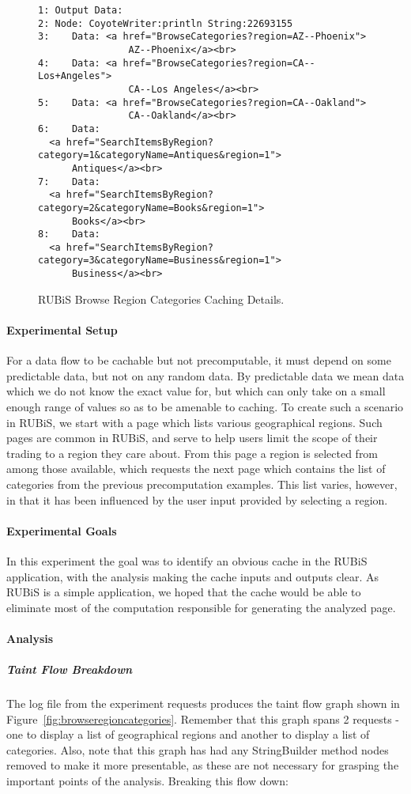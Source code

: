 \documentclass[msc,oneside]{ubcthesis}
\begin{document}
\begin{figure}[ht]
  \caption{\label{fig:browseregioncategoriescd} RUBiS Browse Region Categories Caching Details.}
\begin{verbatim}
1: Output Data:
2: Node: CoyoteWriter:println String:22693155
3:    Data: <a href="BrowseCategories?region=AZ--Phoenix">
                AZ--Phoenix</a><br>
4:    Data: <a href="BrowseCategories?region=CA--Los+Angeles">
                CA--Los Angeles</a><br>
5:    Data: <a href="BrowseCategories?region=CA--Oakland">
                CA--Oakland</a><br>
6:    Data: 
  <a href="SearchItemsByRegion?category=1&categoryName=Antiques&region=1">
      Antiques</a><br>
7:    Data: 
  <a href="SearchItemsByRegion?category=2&categoryName=Books&region=1">
      Books</a><br>
8:    Data: 
  <a href="SearchItemsByRegion?category=3&categoryName=Business&region=1">
      Business</a><br>
\end{verbatim}
\end{figure}

\paragraph{Experimental Setup}
For a data flow to be cachable but not precomputable, it must depend on some predictable data, but not on any random data. By predictable data we mean data which we do not know the exact value for, but which can only take on a small enough range of values so as to be amenable to caching. To create such a scenario in RUBiS, we start with a page which lists various geographical regions. Such pages are common in RUBiS, and serve to help users limit the scope of their trading to a region they care about. From this page a region is selected from among those available, which requests the next page which contains the list of categories from the previous precomputation examples. This list varies, however, in that it has been influenced by the user input provided by selecting a region.

\paragraph{Experimental Goals}
In this experiment the goal was to identify an obvious cache in the RUBiS application, with the analysis making the cache inputs and outputs clear. As RUBiS is a simple application, we hoped that the cache would be able to eliminate most of the computation responsible for generating the analyzed page.

\paragraph{Analysis}
\subparagraph{Taint Flow Breakdown}
The log file from the experiment requests produces the taint flow graph shown in Figure~\ref{fig:browseregioncategories}. Remember that this graph spans 2 requests - one to display a list of geographical regions and another to display a list of categories. Also, note that this graph has had any StringBuilder method nodes removed to make it more presentable, as these are not necessary for grasping the important points of the analysis. Breaking this flow down:
\end{document}
